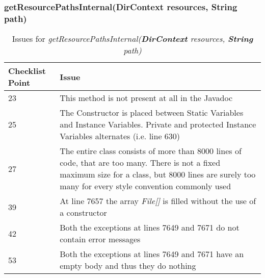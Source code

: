 \subsubsection{getResourcePathsInternal(DirContext resources, String path)}
\begin{table}[htbp]
\begin{center}
\begin{tabular}[t]{p{}p{}}

\hline
\textbf{Checklist Point} & \textbf{Issue} \\
\hline
23 & This method is not present at all in the Javadoc \\
\hline
25 & The Constructor is placed between Static Variables and  Instance Variables. Private and protected Instance Variables alternates (i.e. line 630) \\
\hline
27 & The entire class consists of more than 8000 lines of code, that are too many. There is not a fixed maximum size for a class, but 8000 lines are surely too many for every style convention commonly used \\
\hline
39 & At line 7657 the array \textit{File[]} is filled without the use of a constructor  \\
\hline
42 & Both the exceptions at lines 7649 and 7671 do not contain error messages \\
\hline
53 & Both the exceptions at lines 7649 and 7671 have an empty body and thus they do nothing \\
\hline

\end{tabular}
\end{center}
\caption{Issues for \textit{getResourcePathsInternal(\textbf{DirContext} resources, \textbf{String} path)}}
\end{table}
\clearpage

